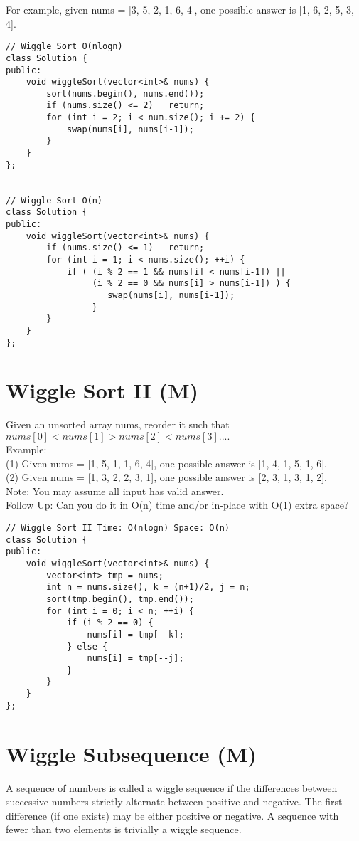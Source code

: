 For example, given nums = [3, 5, 2, 1, 6, 4], one possible answer is [1, 6, 2, 5, 3, 4].\\

\begin{lstlisting}
// Wiggle Sort O(nlogn)
class Solution {
public:
    void wiggleSort(vector<int>& nums) {
        sort(nums.begin(), nums.end());
        if (nums.size() <= 2)   return;
        for (int i = 2; i < num.size(); i += 2) {
            swap(nums[i], nums[i-1]);
        }
    }
};


// Wiggle Sort O(n)
class Solution {
public:
    void wiggleSort(vector<int>& nums) {
        if (nums.size() <= 1)   return;
        for (int i = 1; i < nums.size(); ++i) {
            if ( (i % 2 == 1 && nums[i] < nums[i-1]) ||
                 (i % 2 == 0 && nums[i] > nums[i-1]) ) {
                    swap(nums[i], nums[i-1]);
                 }
        }
    }
};
\end{lstlisting}


\section{Wiggle Sort II (M)}
Given an unsorted array nums, reorder it such that $nums[0] < nums[1] > nums[2] < nums[3]....$ \\

Example:\\
(1) Given nums = [1, 5, 1, 1, 6, 4], one possible answer is [1, 4, 1, 5, 1, 6]. \\
(2) Given nums = [1, 3, 2, 2, 3, 1], one possible answer is [2, 3, 1, 3, 1, 2].\\

Note: You may assume all input has valid answer.\\

Follow Up: Can you do it in O(n) time and/or in-place with O(1) extra space?\\

\begin{lstlisting}
// Wiggle Sort II Time: O(nlogn) Space: O(n)
class Solution {
public:
    void wiggleSort(vector<int>& nums) {
        vector<int> tmp = nums;
        int n = nums.size(), k = (n+1)/2, j = n;
        sort(tmp.begin(), tmp.end());
        for (int i = 0; i < n; ++i) {
            if (i % 2 == 0) {
                nums[i] = tmp[--k];
            } else {
                nums[i] = tmp[--j];
            }
        }
    }
};
\end{lstlisting}


\section{Wiggle Subsequence (M)}
A sequence of numbers is called a wiggle sequence if the differences between successive numbers strictly alternate between positive and negative. The first difference (if one exists) may be either positive or negative. A sequence with fewer than two elements is trivially a wiggle sequence.\\

